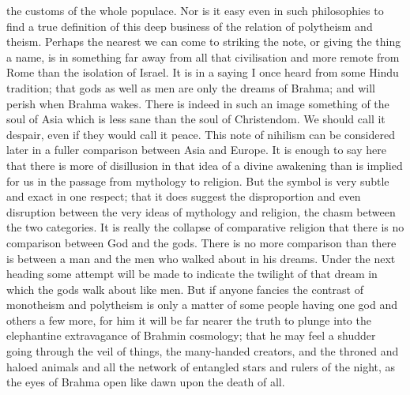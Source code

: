 the customs of the whole populace. Nor is it easy even in such philosophies to find a true definition of this deep business of the relation of polytheism and theism. Perhaps the nearest we can come to striking the note, or giving the thing a name, is in something far away from all that civilisation and more remote from Rome than the isolation of Israel. It is in a saying I once heard from some Hindu tradition; that gods as well as men are only the dreams of Brahma; and will perish when Brahma wakes. There is indeed in such an image something of the soul of Asia which is less sane than the soul of Christendom. We should call it despair, even if they would call it peace. This note of nihilism can be considered later in a fuller comparison between Asia and Europe. It is enough to say here that there is more of disillusion in that idea of a divine awakening than is implied for us in the passage from mythology to religion. But the symbol is very subtle and exact in one respect; that it does suggest the disproportion and even disruption between the very ideas of mythology and religion, the chasm between the two categories. It is really the collapse of comparative religion that there is no comparison between God and the gods. There is no more comparison than there is between a man and the men who walked about in his dreams. Under the next heading some attempt will be made to indicate the twilight of that dream in which the gods walk about like men. But if anyone fancies the contrast of monotheism and polytheism is only a matter of some people having one god and others a few more, for him it will be far nearer the truth to plunge into the elephantine extravagance of Brahmin cosmology; that he may feel a shudder going through the veil of things, the many-handed creators, and the throned and haloed animals and all the network of entangled stars and rulers of the night, as the eyes of Brahma open like dawn upon the death of all.


